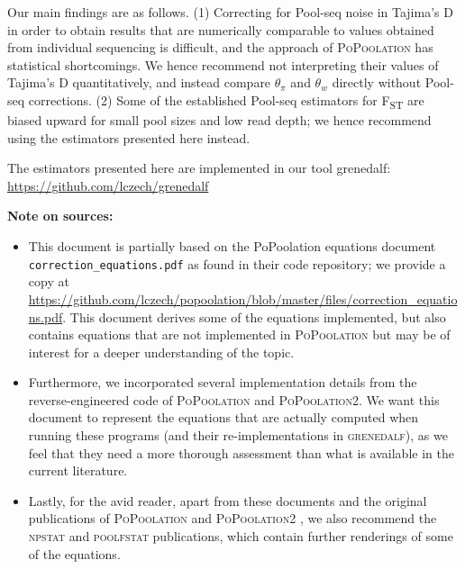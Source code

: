 \documentclass[letterpaper,fontsize=9pt,DIV=12]{scrartcl}
\newcommand\toolname{\textsc}
\newcommand{\fst}{F\textsubscript{ST}}
\begin{document}
Our main findings are as follows. (1) Correcting for Pool-seq noise in Tajima's D in order to obtain results that are numerically comparable to values obtained from individual sequencing is difficult, and the approach of \toolname{PoPoolation} has statistical shortcomings. We hence recommend not interpreting their values of Tajima's D quantitatively, and instead compare $\theta_{\pi}$ and $\theta_{w}$ directly without Pool-seq corrections. (2) Some of the established Pool-seq estimators for \fst{} are biased upward for small pool sizes and low read depth; we hence recommend using the estimators presented here instead.

The estimators presented here are implemented in our tool 
grenedalf: \url{https://github.com/lczech/grenedalf}



\pagebreak

\tableofcontents

\vspace*{5em}
\textbf{Note on sources:}
\begin{itemize}
    \item This document is partially based on the PoPoolation equations document \texttt{correction\_equations.pdf} as found in their code repository; we provide a copy at \url{https://github.com/lczech/popoolation/blob/master/files/correction_equations.pdf}. This document derives some of the equations implemented, but also contains equations that are not implemented in \toolname{PoPoolation} but may be of interest for a deeper understanding of the topic.
    \item Furthermore, we incorporated several implementation details from the reverse-engineered code of \toolname{PoPoolation} and \toolname{PoPoolation2}. We want this document to represent the equations that are actually computed when running these programs (and their re-implementations in \toolname{grenedalf}), as we feel that they need a more thorough assessment than what is available in the current literature.
    \item Lastly, for the avid reader, apart from these documents and the original publications of \toolname{PoPoolation} \cite{Kofler2011a} and \toolname{PoPoolation2} \cite{Kofler2011b}, we also recommend the \toolname{npstat} \cite{Ferretti2013} and \toolname{poolfstat} \cite{Hivert2018,Gautier2022-zd} publications, which contain further renderings of some of the equations.
\end{itemize}
\end{document}
